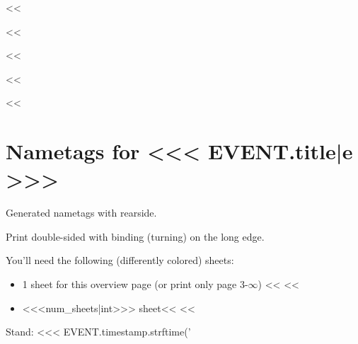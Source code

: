 <<%

<<%

<<%
    \geometry{top=2cm, bottom=2cm, left=1.5cm, right=1.5cm, head=1cm, foot=1cm}


    \chead[]{}
    \ohead[]{\rightmark}
    \cfoot[]{}

    \setlength{\fboxsep}{0pt}
    \setlength{\fboxrule}{.5pt}
    \setlength{\parindent}{0pt}
    \newsavebox{\ntcontent}
<<%

<<%
    \thispagestyle{plain}
    \section*{Nametags for <<< EVENT.title|e >>>}
    Generated nametags with rearside.

    Print double-sided with binding (turning) on the long edge.

    You'll need the following (differently colored) sheets:

    \begin{itemize}
        \item 1 sheet for this overview page (or print only page 3-$\infty$)
        <<%
            <<%
            \item <<<num_sheets|int>>> sheet<<%
        <<%
    \end{itemize}

    \vspace{3\baselineskip}

    Stand: <<< EVENT.timestamp.strftime('%

    \newpage
    \null\newpage

